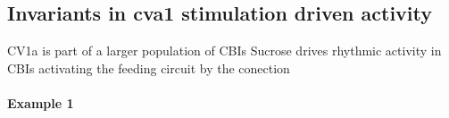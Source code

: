 \subsection{Invariants in cva1 stimulation driven activity}
CV1a is part of a larger population of CBIs 
Sucrose drives rhythmic activity in CBIs activating the feeding circuit by the conection
\paragraph{Example 1}

%

